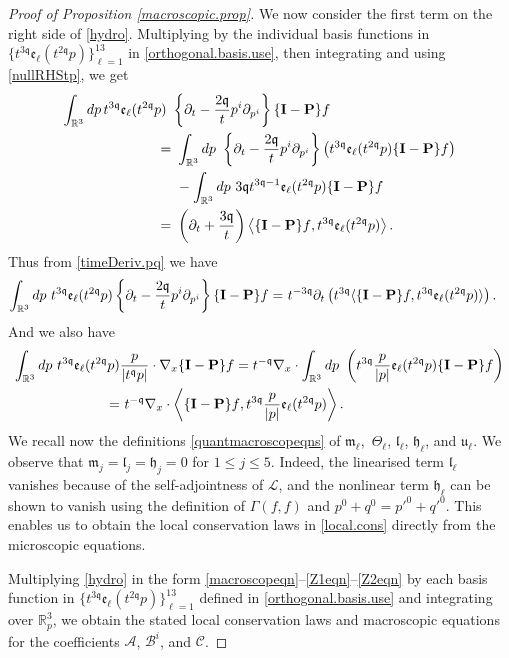 \documentclass[reqno]{amsart}
\newcommand{\pv}{p}
\newcommand{\rth}{{\mathbb{R}^3}}
\newcommand{\irnp}[2]{\left\langle {#1},{#2} \right\rangle}
\newcommand{\threed}{{\mathbb R}^3}
\newcommand{\qq}{\mathfrak{q}}
\newcommand{\tq}{t^{\qq}}
\newcommand{\tmq}{t^{-\qq}}
\newcommand{\tqq}{t^{2\qq}}
\newcommand{\tTq}{t^{3\qq}}
\newcommand{\tmTq}{t^{-3\qq}}
\newcommand{\micro}{{\bf \{I- P\}}}
\newcommand{\highG}{\Theta}
\theoremstyle{definition}
\numberwithin{equation}{section}
\numberwithin{theorem}{section}
\begin{document}
\begin{proof}[Proof of Proposition \ref{macroscopic.prop}]
We now consider the first term on the right side of \eqref{hydro}. Multiplying by the individual basis functions in $\{\tTq \mathfrak{e}_{\ell}(\tqq \pv)\}_{\ell=1}^{13}$ in \eqref{orthogonal.basis.use}, then integrating and using \eqref{nullRHStp}, 
we get 
\begin{align*}
     \int_\rth d \pv\,\tTq \mathfrak{e}_{\ell}(\tqq \pv)~ & \left\{\partial_t -\frac{2\qq }{t} p^i\partial_{p^i} \right\}\micro f
    \\
    = &~
     \int_\rth d \pv~ \left\{\partial_t -\frac{2\qq }{t} p^i \partial_{p^i} \right\}\left( \tTq \mathfrak{e}_{\ell}(\tqq \pv)\micro f \right)
    \\
     &~
     -
          \int_\rth d \pv~ 3 \mathfrak{q} t^{3 \mathfrak{q}-1}  \mathfrak{e}_{\ell}(\tqq \pv)\micro f 
           \\
    = &~
    \left(\partial_t +\frac{3\qq }{t}  \right)
    \irnp{\micro f}{\tTq \mathfrak{e}_{\ell}(\tqq \pv)}.
\end{align*}
Thus from \eqref{timeDeriv.pq} we have 
\begin{align*}
     \int_\rth d \pv~ \tTq \mathfrak{e}_{\ell}(\tqq \pv)  \left\{\partial_t -\frac{2\qq }{t} p^i \partial_{p^i} \right\}  \micro f
    = &~
  \tmTq  \partial_t\left( \tTq
    \langle  \micro f,\tTq \mathfrak{e}_{\ell}(\tqq \pv)\rangle \right).
\end{align*}
And we also have 
\begin{align*}
     \int_\rth d \pv~  \tTq \mathfrak{e}_{\ell}(\tqq \pv) & 
     \frac{\pv}{|\tq \pv|}\cdot \nabla_x \micro f
    = 
   \tmq \nabla_x \cdot \int_\rth d \pv~ \left( \tTq \frac{\pv}{| \pv|}\mathfrak{e}_{\ell}(\tqq \pv)\micro f \right)
           \\
    = &~
    \tmq \nabla_x \cdot
    \irnp{\micro f}{\tTq \frac{\pv}{| \pv|}\mathfrak{e}_{\ell}(\tqq \pv)}.
\end{align*}
We recall now the definitions \eqref{quantmacroscopeqns} of \(\mathfrak{m}_{\ell},\) \(\highG_{\ell}\), \(\mathfrak{l}_{\ell}\), \(\mathfrak{h}_{\ell}\), and \(\mathfrak{u}_{\ell}\). We observe that $\mathfrak{m}_j = \mathfrak{l}_j = \mathfrak{h}_j = 0$ for $1  \leq j\leq  5$. Indeed, the linearised term \(\mathfrak{l}_{\ell}\) vanishes because of the self-adjointness of \(\mathcal{L}\), and the nonlinear term \(\mathfrak{h}_{\ell}\) can be shown to vanish using the definition of \(\Gamma(f,f)\) and \(p^0+q^0=p'^0+q'^0\). This enables us to obtain the local conservation laws in \eqref{local.cons} directly from the microscopic equations.


Multiplying \eqref{hydro} in the form \eqref{macroscopeqn}--\eqref{Z1eqn}--\eqref{Z2eqn} by each basis function in $\{\tTq \mathfrak{e}_{\ell}(\tqq \pv)\}_{\ell=1}^{13}$ defined in \eqref{orthogonal.basis.use} and integrating over $\threed_p$, we obtain the stated local conservation laws and macroscopic equations for the coefficients \(\mathcal{A}\), \(\mathcal{B}^i\), and \(\mathcal{C}\).
\end{proof}
\end{document}
